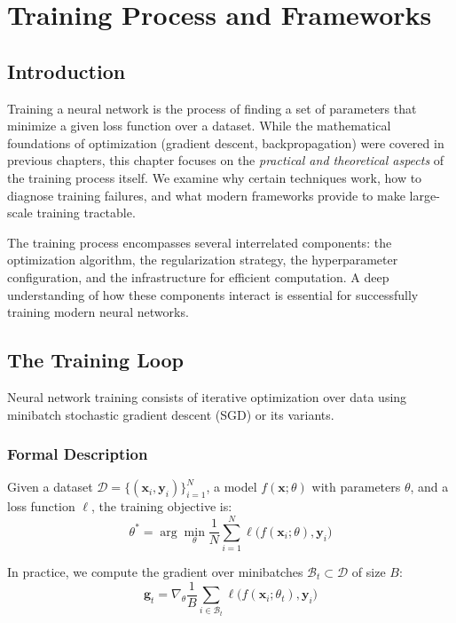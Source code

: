 \clearpage
\cleardoublepage

\chapter{Training Process and Frameworks}

\section{Introduction}

Training a neural network is the process of finding a set of parameters that minimize a given loss function over a dataset. While the mathematical foundations of optimization (gradient descent, backpropagation) were covered in previous chapters, this chapter focuses on the \emph{practical and theoretical aspects} of the training process itself. We examine why certain techniques work, how to diagnose training failures, and what modern frameworks provide to make large-scale training tractable.

The training process encompasses several interrelated components: the optimization algorithm, the regularization strategy, the hyperparameter configuration, and the infrastructure for efficient computation. A deep understanding of how these components interact is essential for successfully training modern neural networks.

\section{The Training Loop}

Neural network training consists of iterative optimization over data using minibatch stochastic gradient descent (SGD) or its variants.

\subsection{Formal Description}

Given a dataset $\mathcal{D} = \{(\mathbf{x}_i, \mathbf{y}_i)\}_{i=1}^{N}$, a model $f(\mathbf{x}; \theta)$ with parameters $\theta$, and a loss function $\ell$, the training objective is:
\begin{equation}
\theta^* = \arg\min_{\theta} \frac{1}{N}\sum_{i=1}^{N} \ell\bigl(f(\mathbf{x}_i; \theta), \mathbf{y}_i\bigr)
\end{equation}

In practice, we compute the gradient over minibatches $\mathcal{B}_t \subset \mathcal{D}$ of size $B$:
\begin{equation}
\mathbf{g}_t = \nabla_\theta \frac{1}{B}\sum_{i \in \mathcal{B}_t} \ell\bigl(f(\mathbf{x}_i; \theta_t), \mathbf{y}_i\bigr)
\end{equation}


